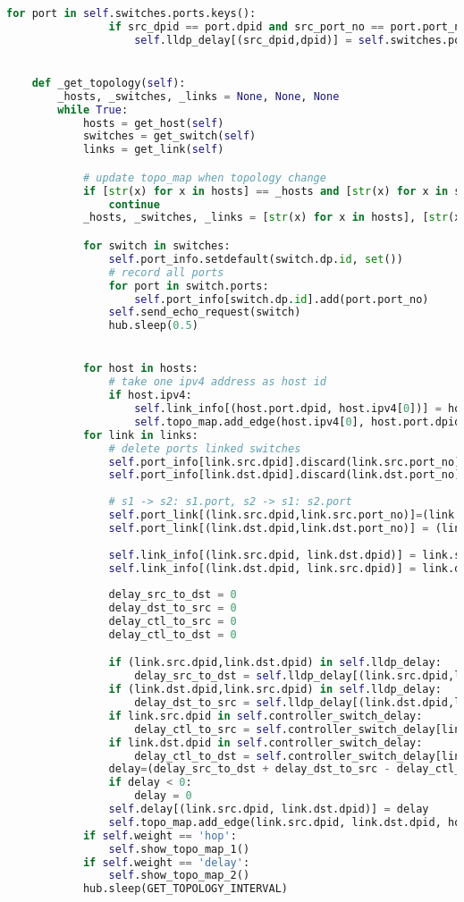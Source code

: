 \documentclass{xjtureport}
\begin{document}
\begin{lstlisting}[language=python]
			for port in self.switches.ports.keys():
				if src_dpid == port.dpid and src_port_no == port.port_no:
					self.lldp_delay[(src_dpid,dpid)] = self.switches.ports[port].delay * 1000


	def _get_topology(self):
		_hosts, _switches, _links = None, None, None
		while True:
			hosts = get_host(self)
			switches = get_switch(self)
			links = get_link(self)

			# update topo_map when topology change
			if [str(x) for x in hosts] == _hosts and [str(x) for x in switches] == _switches and [str(x) for x in links] == _links:
				continue
			_hosts, _switches, _links = [str(x) for x in hosts], [str(x) for x in switches], [str(x) for x in links]

			for switch in switches:
				self.port_info.setdefault(switch.dp.id, set())
				# record all ports
				for port in switch.ports:
					self.port_info[switch.dp.id].add(port.port_no)
				self.send_echo_request(switch)
				hub.sleep(0.5)


			for host in hosts:
				# take one ipv4 address as host id
				if host.ipv4:
					self.link_info[(host.port.dpid, host.ipv4[0])] = host.port.port_no
					self.topo_map.add_edge(host.ipv4[0], host.port.dpid, hop=1, delay=0, is_host=True)
			for link in links:
				# delete ports linked switches
				self.port_info[link.src.dpid].discard(link.src.port_no)
				self.port_info[link.dst.dpid].discard(link.dst.port_no)
				
				# s1 -> s2: s1.port, s2 -> s1: s2.port
				self.port_link[(link.src.dpid,link.src.port_no)]=(link.src.dpid, link.dst.dpid)
				self.port_link[(link.dst.dpid,link.dst.port_no)] = (link.dst.dpid, link.src.dpid)
				
				self.link_info[(link.src.dpid, link.dst.dpid)] = link.src.port_no
				self.link_info[(link.dst.dpid, link.src.dpid)] = link.dst.port_no
				
				delay_src_to_dst = 0
				delay_dst_to_src = 0
				delay_ctl_to_src = 0
				delay_ctl_to_dst = 0

				if (link.src.dpid,link.dst.dpid) in self.lldp_delay:
					delay_src_to_dst = self.lldp_delay[(link.src.dpid,link.dst.dpid)]
				if (link.dst.dpid,link.src.dpid) in self.lldp_delay:
					delay_dst_to_src = self.lldp_delay[(link.dst.dpid,link.src.dpid)]
				if link.src.dpid in self.controller_switch_delay:
					delay_ctl_to_src = self.controller_switch_delay[link.src.dpid]
				if link.dst.dpid in self.controller_switch_delay:
					delay_ctl_to_dst = self.controller_switch_delay[link.dst.dpid]
				delay=(delay_src_to_dst + delay_dst_to_src - delay_ctl_to_src - delay_ctl_to_dst) / 2
				if delay < 0:
					delay = 0
				self.delay[(link.src.dpid, link.dst.dpid)] = delay
				self.topo_map.add_edge(link.src.dpid, link.dst.dpid, hop=1, delay=delay,is_host=False)
			if self.weight == 'hop':
				self.show_topo_map_1()
			if self.weight == 'delay':
				self.show_topo_map_2()
			hub.sleep(GET_TOPOLOGY_INTERVAL)


\end{lstlisting}
\end{document}
